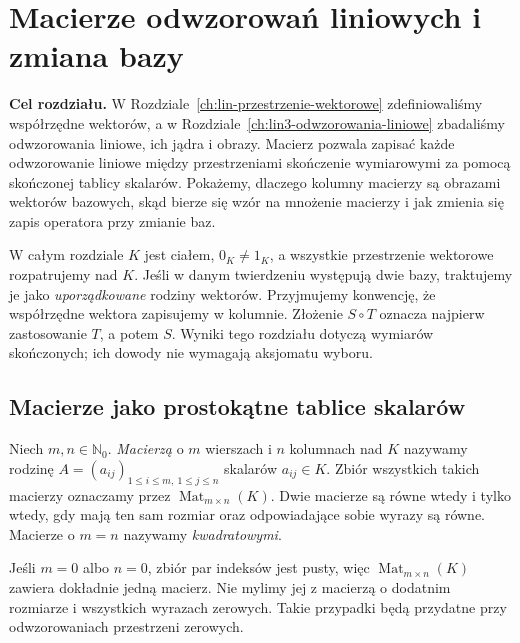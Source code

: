 \chapter{Macierze odwzorowań liniowych i zmiana bazy}
\label{ch:lin4-macierze-zmiana-bazy}

\noindent\textbf{Cel rozdziału.}
W Rozdziale~\ref{ch:lin-przestrzenie-wektorowe}
zdefiniowaliśmy współrzędne wektorów,
a w Rozdziale~\ref{ch:lin3-odwzorowania-liniowe}
zbadaliśmy odwzorowania liniowe, ich jądra i obrazy.
Macierz pozwala zapisać każde odwzorowanie liniowe
między przestrzeniami skończenie wymiarowymi
za pomocą skończonej tablicy skalarów.
Pokażemy, dlaczego kolumny macierzy są obrazami
wektorów bazowych, skąd bierze się wzór na mnożenie
macierzy i jak zmienia się zapis operatora
przy zmianie baz.

W całym rozdziale \(K\) jest ciałem,
\(0_K\neq1_K\), a wszystkie przestrzenie wektorowe
rozpatrujemy nad \(K\). Jeśli w danym twierdzeniu
występują dwie bazy, traktujemy je jako
\emph{uporządkowane} rodziny wektorów.
Przyjmujemy konwencję, że współrzędne wektora
zapisujemy w kolumnie. Złożenie \(S\circ T\)
oznacza najpierw zastosowanie \(T\), a potem \(S\).
Wyniki tego rozdziału dotyczą wymiarów skończonych;
ich dowody nie wymagają aksjomatu wyboru.

\section{Macierze jako prostokątne tablice skalarów}
\label{sec:lin4-definicja-macierzy}

\begin{definicja}
\label{def:lin4-macierz}
Niech \(m,n\in\mathbb N_0\).
\emph{Macierzą} o \(m\) wierszach i \(n\) kolumnach
nad \(K\) nazywamy rodzinę
\(A=(a_{ij})_{1\leq i\leq m,\ 1\leq j\leq n}\)
skalarów \(a_{ij}\in K\).
Zbiór wszystkich takich macierzy oznaczamy
przez \(\operatorname{Mat}_{m\times n}(K)\).
Dwie macierze są równe wtedy i tylko wtedy,
gdy mają ten sam rozmiar oraz odpowiadające
sobie wyrazy są równe.
Macierze o \(m=n\) nazywamy \emph{kwadratowymi}.
\end{definicja}

Jeśli \(m=0\) albo \(n=0\), zbiór par
indeksów jest pusty, więc
\(\operatorname{Mat}_{m\times n}(K)\) zawiera
dokładnie jedną macierz. Nie mylimy jej
z macierzą o dodatnim rozmiarze
i wszystkich wyrazach zerowych.
Takie przypadki będą przydatne
przy odwzorowaniach przestrzeni zerowych.

